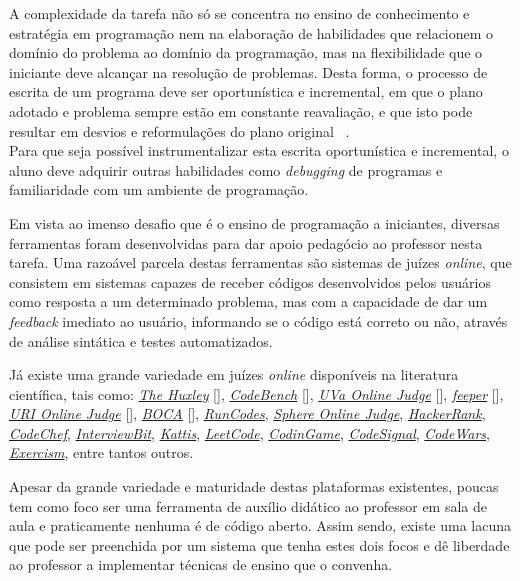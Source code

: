 A complexidade da tarefa não só se concentra no ensino de conhecimento e 
estratégia em programação nem na elaboração de habilidades que relacionem o domínio 
do problema ao domínio da programação, mas na flexibilidade que o iniciante deve 
alcançar na resolução de problemas. Desta forma, o processo de escrita 
de um programa deve  ser oportunística e incremental, em que o plano adotado 
e problema sempre estão em 
constante reavaliação, e que isto pode resultar em desvios e reformulações do plano
original \ \cite{visser1990more}. \\
Para que seja possível instrumentalizar esta escrita oportunística e incremental, 
o aluno deve adquirir outras habilidades como \emph{debugging} de programas e 
familiaridade com um ambiente de programação.

Em vista ao imenso desafio que é o ensino de programação a iniciantes, diversas ferramentas 
foram desenvolvidas para dar apoio pedagócio ao professor nesta tarefa. Uma razoável parcela 
destas ferramentas são sistemas de juízes \emph{online}, que consistem em sistemas capazes 
de receber códigos desenvolvidos pelos usuários como resposta a um determinado problema, mas 
com a capacidade de dar um \emph{feedback} imediato ao usuário, informando 
se o código está correto ou não, através de análise sintática e testes automatizados.

Já existe uma grande variedade em juízes \emph{online} disponíveis na literatura científica,
tais como: 
\hyperref[link:the_huxley]{\emph{The Huxley}} [], 
	\hyperref[link:code_bench]{\emph{CodeBench}} [],  
	\hyperref[link:uva_judge]{\emph{UVa Online Judge}} [], 
	\hyperref[link:feeper]{\emph{feeper}} [], 
	\hyperref[link:uri_judge]{\emph{URI Online Judge}} [], 
	\hyperref[link:boca]{\emph{BOCA}} [],
	\hyperref[link:we_run_codes]{\emph{RunCodes}},
	\hyperref[link:sphere_judge]{\emph{Sphere Online Judge}},
	\hyperref[link:hacker_rank]{\emph{HackerRank}}, 
	\hyperref[link:code_chef]{\emph{CodeChef}}, 
	\hyperref[link:interview_bit]{\emph{InterviewBit}}, 
	\hyperref[link:kattis]{\emph{Kattis}}, 
	\hyperref[link:leet_code]{\emph{LeetCode}}, 
	\hyperref[link:codin_game]{\emph{CodinGame}}, 
	\hyperref[link:code_signal]{\emph{CodeSignal}}, 
	\hyperref[link:code_wars]{\emph{CodeWars}}, 
	\hyperref[link:exercism]{\emph{Exercism}}, 
	entre tantos outros.

Apesar da grande variedade e maturidade destas plataformas existentes, poucas 
tem como foco ser uma ferramenta de auxílio didático ao professor em sala de aula e 
praticamente nenhuma é de código aberto. Assim sendo, existe uma lacuna que pode
ser preenchida por um sistema que tenha estes dois focos e dê liberdade ao professor 
a implementar técnicas de ensino que o convenha.


